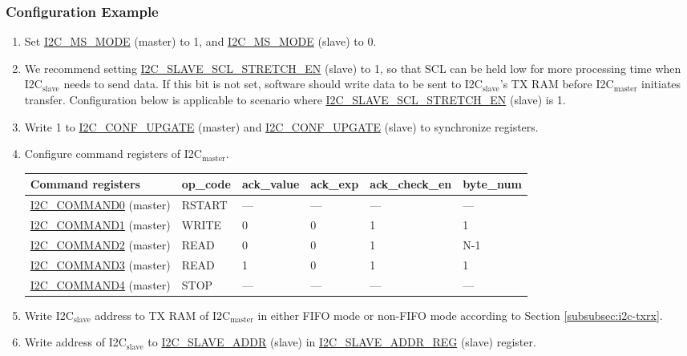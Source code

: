 \documentclass[main\_\_EN.tex]{subfiles}
\begin{document}
\subsubsection{Configuration Example}
\begin{enumerate}
\item Set \hyperref[fielddesc:I2CMSMODE]{I2C\_MS\_MODE} (master) to 1, and \hyperref[fielddesc:I2CMSMODE]{I2C\_MS\_MODE} (slave) to 0.
\item We recommend setting \hyperref[fielddesc:I2CSLAVESCLSTRETCHEN]{I2C\_SLAVE\_SCL\_STRETCH\_EN} (slave) to 1, so that SCL can be held low for more processing time when I2C$_\text{slave}$ needs to send data. If this bit is not set, software should write data to be sent to I2C$_\text{slave}$'s TX RAM before I2C$_\text{master}$ initiates transfer. Configuration below is applicable to scenario where \hyperref[fielddesc:I2CSLAVESCLSTRETCHEN]{I2C\_SLAVE\_SCL\_STRETCH\_EN} (slave) is 1.
\item Write 1 to \hyperref[fielddesc:I2CCONFUPGATE]{I2C\_CONF\_UPGATE} (master) and \hyperref[fielddesc:I2CCONFUPGATE]{I2C\_CONF\_UPGATE} (slave) to synchronize registers.
\item Configure command registers of I2C$_\text{master}$.
\begin{longtable}{ | p{4cm} | p{2cm} | p{2cm} | p{2cm} |p{2cm} | p{2cm} |}
\hline\rowcolor{lightgray}
Command registers & op\_code & ack\_value&ack\_exp&ack\_check\_en&byte\_num  \\ \hline
\hyperref[fielddesc:I2CCOMMAND0]{I2C\_COMMAND0} (master)& RSTART& ---&---&---&---  \\ \hline
\hyperref[fielddesc:I2CCOMMAND1]{I2C\_COMMAND1} (master)& WRITE& 0&0&1&1  \\ \hline
\hyperref[fielddesc:I2CCOMMAND2]{I2C\_COMMAND2} (master)& READ& 0&0&1&N-1  \\ \hline
\hyperref[fielddesc:I2CCOMMAND3]{I2C\_COMMAND3} (master)& READ& 1&0&1&1  \\ \hline
\hyperref[fielddesc:I2CCOMMAND4]{I2C\_COMMAND4} (master)& STOP& ---&---&---&---  \\ \hline
\end{longtable}
\item Write I2C$_\text{slave}$ address to TX RAM of I2C$_\text{master}$ in either FIFO mode or non-FIFO mode according to Section \ref{subsubsec:i2c-txrx}.
\item Write address of I2C$_\text{slave}$ to \hyperref[fielddesc:I2CSLAVEADDR]{I2C\_SLAVE\_ADDR} (slave) in \hyperref[regdesc:I2CSLAVEADDRREG]{I2C\_SLAVE\_ADDR\_REG} (slave) register.

\end{enumerate}
\end{document}
